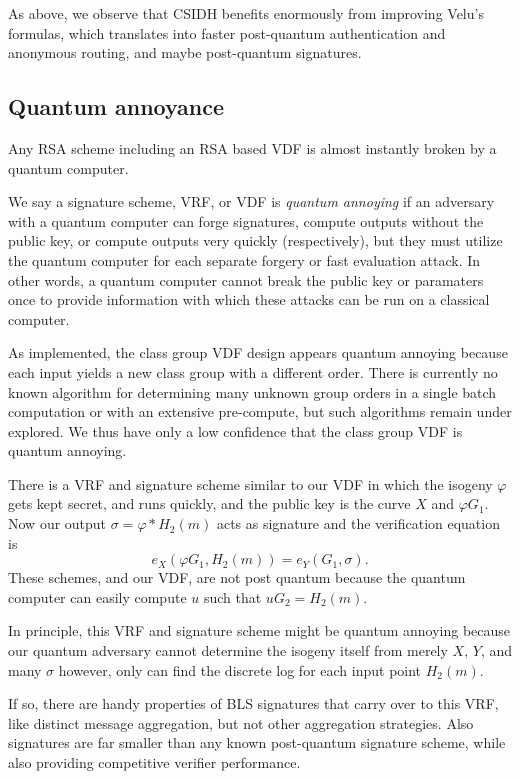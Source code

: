 \documentclass{article}
\newcommand\mathperiod{.}
\begin{document}
As above, we observe that CSIDH \cite{10.1007/978-3-030-03332-3_15} benefits enormously from
improving Velu's formulas, which translates into faster post-quantum
authentication and anonymous routing, and maybe post-quantum signatures.

\subsection{Quantum annoyance}

Any RSA scheme including an RSA based VDF is almost instantly broken
by a quantum computer. 

We say a signature scheme, VRF, or VDF is {\em quantum annoying} if
an adversary with a quantum computer can forge signatures, compute
outputs without the public key, or compute outputs very quickly
(respectively), but they must utilize the quantum computer for each
separate forgery or fast evaluation attack.
In other words, a quantum computer cannot break the public key or
paramaters once to provide information with which these attacks can
be run on a classical computer. 

As implemented, the class group VDF design appears quantum annoying
because each input yields a new class group with a different order.
There is currently no known algorithm for determining many unknown
group orders in a single batch computation or with an extensive
pre-compute, but such algorithms remain under explored.  We thus
have only a low confidence that the class group VDF is quantum annoying.

There is a VRF and signature scheme similar to our VDF in which the
isogeny $φ$ gets kept secret, and runs quickly, and the public key
is the curve $X$ and $φ G_1$.  Now our output $\sigma = φ* H_2(m)$
acts as signature and the verification equation is 
$$ e_X( φ G_1, H_2(m) ) = e_Y( G_1, \sigma ) \mathperiod $$
These schemes, and our VDF, are not post quantum because the
quantum computer can easily compute $u$ such that $u G_2 = H_2(m)$.

In principle, this VRF and signature scheme might be quantum annoying
because our quantum adversary cannot determine the isogeny itself
from merely $X$, $Y$, and many $\sigma$ however, only can find the
discrete log for each input point $H_2(m)$.

If so, there are handy properties of BLS signatures that carry over
to this VRF, like distinct message aggregation, but not other
aggregation strategies.  Also signatures are far smaller than any
known post-quantum signature scheme, while also providing competitive
verifier performance.  
\end{document}
